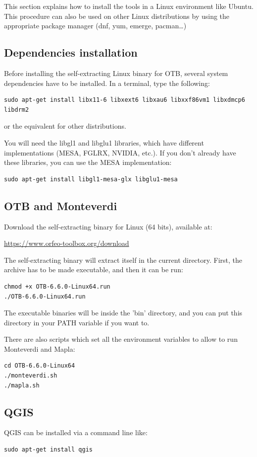 \documentclass[10pt,a4paper]{article}
\begin{document}
This section explains how to install the tools in a Linux environment like Ubuntu. This procedure can also be used on other Linux distributions by using the appropriate package manager (dnf, yum,
emerge, pacman\ldots)

\subsection{Dependencies installation}
Before installing the self-extracting Linux binary for OTB, several system dependencies have to be installed. In a terminal, type the following:
\begin{verbatim}
sudo apt-get install libx11-6 libxext6 libxau6 libxxf86vm1 libxdmcp6 libdrm2
\end{verbatim}
or the equivalent for other distributions.

You will need the libgl1 and libglu1 libraries, which have different implementations (MESA, FGLRX, NVIDIA, etc.). If you don't already have these libraries, you can use the MESA implementation:
\begin{verbatim}
sudo apt-get install libgl1-mesa-glx libglu1-mesa
\end{verbatim}

\subsection{OTB and Monteverdi}
Download the self-extracting binary for Linux (64 bits), available at:
\begin{center}
\url{https://www.orfeo-toolbox.org/download}
\end{center}

The self-extracting binary will extract itself in the current directory. First, the archive has to be made executable, and then it can be run:
\begin{verbatim}
chmod +x OTB-6.6.0-Linux64.run
./OTB-6.6.0-Linux64.run
\end{verbatim}

The executable binaries will be inside the 'bin' directory, and you can put this directory in your PATH variable if you want to. 

There are also scripts which set all the environment variables to allow to run Monteverdi and Mapla:
\begin{verbatim}
cd OTB-6.6.0-Linux64
./monteverdi.sh
./mapla.sh
\end{verbatim}


\subsection{QGIS}
QGIS can be installed via a command line like:
\begin{verbatim}
sudo apt-get install qgis
\end{verbatim}
\end{document}
